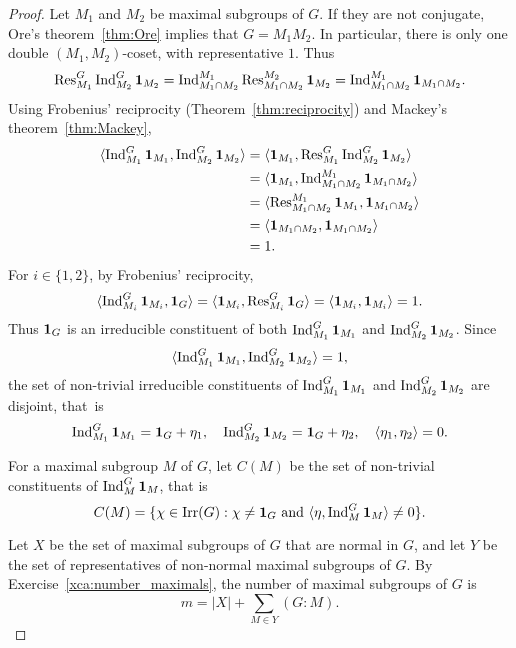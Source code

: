 \begin{proof}
    Let $M_1$ and $M_2$ be maximal subgroups of $G$. If they are not conjugate, 
    Ore's theorem~\ref{thm:Ore} implies that $G=M_1M_2$. In particular, 
    there is only one double $(M_1,M_2)$-coset, with representative $1$. Thus
    \[
    \operatorname{Res}_{M_1}^G\operatorname{Ind}_{M_2}^G\mathbf{1}_{M_2}=\operatorname{Ind}_{M_1\cap M_2}^{M_1}\operatorname{Res}_{M_1\cap M_2}^{M_2}\mathbf{1}_{M_2}
    =\operatorname{Ind}_{M_1\cap M_2}^{M_1}\mathbf{1}_{M_1\cap M_2}.
    \]
    Using Frobenius' reciprocity (Theorem~\ref{thm:reciprocity}) and 
    Mackey's theorem~\ref{thm:Mackey}, 
    \begin{align*}
    \langle\operatorname{Ind}_{M_1}^G\mathbf{1}_{M_1},\operatorname{Ind}_{M_2}^G\mathbf{1}_{M_2}\rangle
    &=\langle \mathbf{1}_{M_1},\operatorname{Res}_{M_1}^G\operatorname{Ind}_{M_2}^G\mathbf{1}_{M_2}\rangle\\
    &=\langle \mathbf{1}_{M_1},\operatorname{Ind}_{M_1\cap M_2}^{M_1}\mathbf{1}_{M_1\cap M_2}\rangle\\
    &=\langle \operatorname{Res}_{M_1\cap M_2}^{M_1}\mathbf{1}_{M_1},\mathbf{1}_{M_1\cap M_2}\rangle\\
    &=\langle \mathbf{1}_{M_1\cap M_2},\mathbf{1}_{M_1\cap M_2}\rangle\\
    &=1.
    \end{align*}
    For $i\in\{1,2\}$, by Frobenius' reciprocity, 
    \[
    \langle\operatorname{Ind}_{M_i}^G\mathbf{1}_{M_i},\mathbf{1}_G\rangle
    =\langle\mathbf{1}_{M_i},\operatorname{Res}_{M_i}^G\mathbf{1}_G\rangle=\langle \mathbf{1}_{M_i},\mathbf{1}_{M_i}\rangle=1.
    \]
    Thus $\mathbf{1}_{G}$ is an irreducible constituent of both 
    $\operatorname{Ind}_{M_1}^G\mathbf{1}_{M_1}$ and $\operatorname{Ind}_{M_2}^G\mathbf{1}_{M_2}$. Since 
    \[
    \langle\operatorname{Ind}_{M_1}^G\mathbf{1}_{M_1},\operatorname{Ind}_{M_2}^G\mathbf{1}_{M_2}\rangle=1,
    \]
    the set of non-trivial 
    irreducible
    constituents of $\operatorname{Ind}_{M_1}^G\mathbf{1}_{M_1}$ and $\operatorname{Ind}_{M_2}^G\mathbf{1}_{M_2}$ are disjoint, that~is  
    \[
    \operatorname{Ind}_{M_1}^G\mathbf{1}_{M_1}=\mathbf{1}_G+\eta_1,
    \quad 
    \operatorname{Ind}_{M_2}^G\mathbf{1}_{M_2}=\mathbf{1}_G+\eta_2,
    \quad 
    \langle\eta_1,\eta_2\rangle=0.
    \]

    For a maximal subgroup $M$ of $G$, let 
    $C(M)$ be the set of non-trivial constituents
    of $\operatorname{Ind}_M^G\mathbf{1}_M$, that is
    \[
    C(M)=\{\chi\in\operatorname{Irr}(G):\chi\ne\mathbf{1}_G\text{ and }\langle\eta,\operatorname{Ind}_M^G\mathbf{1}_M\rangle\ne0\}.
    \]
    
   Let $X$ be the set of maximal subgroups of $G$ that are normal in $G$, and 
   let $Y$ be the set of representatives of non-normal 
   maximal subgroups of $G$. By Exercise~\ref{xca:number_maximals}, 
   the number of 
   maximal subgroups of $G$ is 
   \[
   m=|X|+\sum_{M\in Y}(G:M).
   \]


\end{proof}
